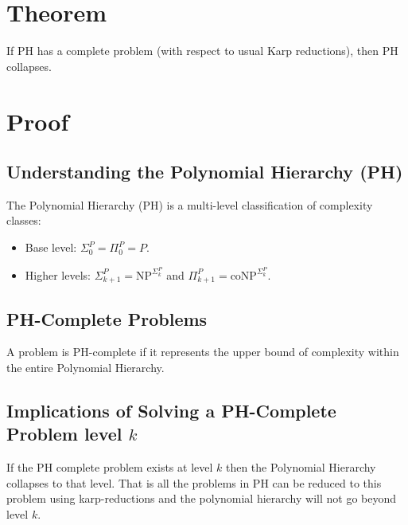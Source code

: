 \documentclass{article}
\begin{document}
\section*{Theorem}
If PH has a complete problem (with respect to usual Karp reductions), then PH collapses.

\section*{Proof}

\subsection*{Understanding the Polynomial Hierarchy (PH)}
The Polynomial Hierarchy (PH) is a multi-level classification of complexity classes:
\begin{itemize}
  \item Base level: \( \Sigma_0^P = \Pi_0^P = P \).
  \item Higher levels: \( \Sigma_{k+1}^P = \text{NP}^{\Sigma_k^P} \) and \( \Pi_{k+1}^P = \text{coNP}^{\Sigma_k^P} \).
\end{itemize}

\subsection*{PH-Complete Problems}
A problem is PH-complete if it represents the upper bound of complexity within the entire Polynomial Hierarchy.

\subsection*{Implications of Solving a PH-Complete Problem level $k$}

If the PH complete problem exists at level $k$ then the Polynomial Hierarchy collapses to that level. That is all the problems in PH can be reduced to this problem using karp-reductions and the polynomial hierarchy will not go beyond level $k$.
\end{document}

